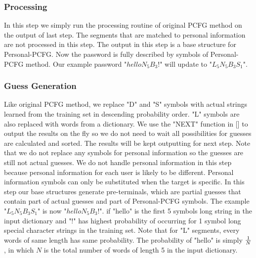 \documentclass{sig-alternate}
\begin{document}
\subsubsection{Processing}
In this step we simply run the processing routine of original PCFG method on the output of last step. The segments that are matched to personal information are not processed in this step. The output in this step is a base structure for Personal-PCFG. Now the password is fully described by symbols of Personal-PCFG method. Our example password "$helloN_5B_3!$" will update to "$L_5N_5B_3S_1$". 
\subsubsection{Guess Generation}
Like original PCFG method, we replace "D" and "S" symbols with actual strings learned from the training set in descending probability order. "L" symbols are also replaced with words from a dictionary. We use the "NEXT" function in [] to output the results on the fly so we do not need to wait all possibilities for guesses are calculated and sorted. The results will be kept outputting for next step. Note that we do not replace any symbols for personal information so the guesses are still not actual guesses. We do not handle personal information in this step because personal information for each user is likely to be different. Personal information symbols can only be substituted when the target is specific. In this step our base structures generate pre-terminals, which are partial guesses that contain part of actual guesses and part of Personal-PCFG symbols. The example "$L_5N_5B_3S_1$" is now "$helloN_5B_3!$". if "hello" is the first 5 symbols long string in the input dictionary and "!" has highest probability of occurring for 1 symbol long special character strings in the training set. Note that for "L" segments, every words of same length has same probability. The probability of "hello" is simply $1\over N$, in which $N$ is the total number of words of length 5 in the input dictionary. 
\end{document}
